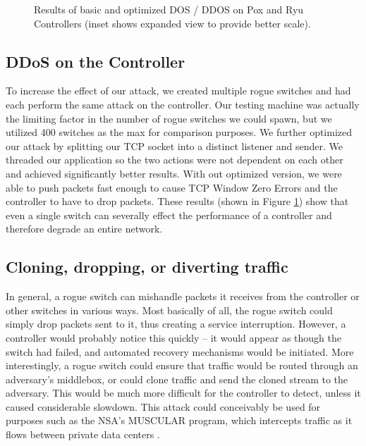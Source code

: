 \begin{figure}[ht]
	{\setlength{\fboxsep}{0pt}%
	\setlength{\fboxrule}{1pt}%
	}%
  \caption{Results of basic and optimized DOS / DDOS on Pox and Ryu Controllers (inset shows expanded view to provide better scale).}
  \label{fig:DOSattacks}
\end{figure}

\subsection{DDoS on the Controller}
   To increase the effect of our attack, we created multiple rogue switches and had each perform the same attack on the controller. Our testing machine was actually the limiting factor in the number of rogue switches we could spawn, but we utilized 400 switches as the max for comparison purposes.  We further optimized our attack by splitting our TCP socket into a distinct listener and sender. We threaded our application so the two actions were not dependent on each other and achieved significantly better results. With out optimized version, we were able to push packets fast enough to cause TCP Window Zero Errors and the controller to have to drop packets.  These results (shown in Figure \ref{fig:DOSattacks}) show that even a single switch can severally effect the performance of a controller and therefore degrade an entire network. 

\subsection{Cloning, dropping, or diverting traffic}

In general, a rogue switch can mishandle packets it receives from the controller or other switches in various ways. Most basically of all, the rogue switch could simply drop packets sent to it, thus creating a service interruption. However, a controller would probably notice this quickly -- it would appear as though the switch had failed, and automated recovery mechanisms would be initiated. More interestingly, a rogue switch could ensure that traffic would be routed through an adversary's middlebox, or could clone traffic and send the cloned stream to the adversary. This would be much more difficult for the controller to detect, unless it caused considerable slowdown. This attack could conceivably be used for purposes such as the NSA's MUSCULAR program, which intercepts traffic as it flows between private data centers \cite{muscular}. 


